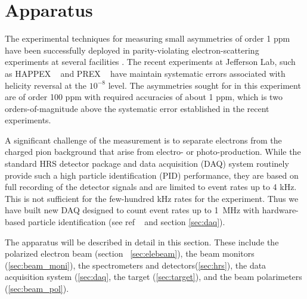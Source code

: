 
\section{Apparatus}\label{sec:apparatus}

\par The experimental techniques for measuring small 
asymmetries of order 1 ppm have been successfully deployed in
parity-violating electron-scattering experiments at several
facilities \cite{SLAC,bates,mainz1,happex,g0,prex,qweak,mainz2}.
The recent experiments at Jefferson Lab, such as HAPPEX ~\cite{happex}
and PREX ~\cite{prex} have maintain systematic errors associated with helicity
reversal at the $10^{-8}$ level.
The asymmetries sought for in this experiment are of order 100 ppm with
required accuracies of about 1 ppm, which is two orders-of-magnitude 
above the systematic error established in the recent experiments.

A significant challenge of the measurement 
is to separate electrons from the charged pion background 
that arise from electro- or photo-production. 
While the standard HRS detector package and data 
acquisition (DAQ) system routinely provide 
such a high particle identification (PID) performance, 
they are based on full recording 
of the detector signals and are limited to event rates up to 4 kHz.
This is not sufficient for the few-hundred kHz rates 
for the experiment. 
Thus we have built new DAQ designed to count event 
rates up to 1~MHz with hardware-based 
particle identification (see ref ~\cite{pvdis_nim} and section \ref{sec:daq}).

The apparatus will be described in detail in this section.
These include the polarized electron beam
(section ~\ref{sec:elebeam}), the beam monitors (\ref{sec:beam_moni}), 
the spectrometers and detectors(\ref{sec:hrs}), 
the data acquisition system (\ref{sec:daq}, 
the target (\ref{sec:target}),
and the beam polarimeters (\ref{sec:beam_pol}).



